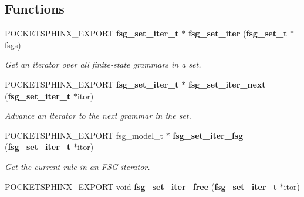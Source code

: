 \subsection*{\-Functions}
\begin{DoxyCompactItemize}
\item 
\-P\-O\-C\-K\-E\-T\-S\-P\-H\-I\-N\-X\-\_\-\-E\-X\-P\-O\-R\-T \*
{\bf fsg\-\_\-set\-\_\-iter\-\_\-t} $\ast$ {\bf fsg\-\_\-set\-\_\-iter} ({\bf fsg\-\_\-set\-\_\-t} $\ast$fsgs)\label{fsg__set_8h_ae258fe4457affc6de5548330f33470ca}

\begin{DoxyCompactList}\small\item\em \-Get an iterator over all finite-\/state grammars in a set. \end{DoxyCompactList}\item 
\-P\-O\-C\-K\-E\-T\-S\-P\-H\-I\-N\-X\-\_\-\-E\-X\-P\-O\-R\-T \*
{\bf fsg\-\_\-set\-\_\-iter\-\_\-t} $\ast$ {\bf fsg\-\_\-set\-\_\-iter\-\_\-next} ({\bf fsg\-\_\-set\-\_\-iter\-\_\-t} $\ast$itor)\label{fsg__set_8h_a50a455ce026c87a66d85363e874e982d}

\begin{DoxyCompactList}\small\item\em \-Advance an iterator to the next grammar in the set. \end{DoxyCompactList}\item 
\-P\-O\-C\-K\-E\-T\-S\-P\-H\-I\-N\-X\-\_\-\-E\-X\-P\-O\-R\-T fsg\-\_\-model\-\_\-t $\ast$ {\bf fsg\-\_\-set\-\_\-iter\-\_\-fsg} ({\bf fsg\-\_\-set\-\_\-iter\-\_\-t} $\ast$itor)\label{fsg__set_8h_a139c12323411b8366c66e97e112ca8c1}

\begin{DoxyCompactList}\small\item\em \-Get the current rule in an \-F\-S\-G iterator. \end{DoxyCompactList}\item 
\-P\-O\-C\-K\-E\-T\-S\-P\-H\-I\-N\-X\-\_\-\-E\-X\-P\-O\-R\-T void {\bf fsg\-\_\-set\-\_\-iter\-\_\-free} ({\bf fsg\-\_\-set\-\_\-iter\-\_\-t} $\ast$itor)\label{fsg__set_8h_a4e31d748ffd9d99fc626c2a1036c3699}


\end{DoxyCompactItemize}
